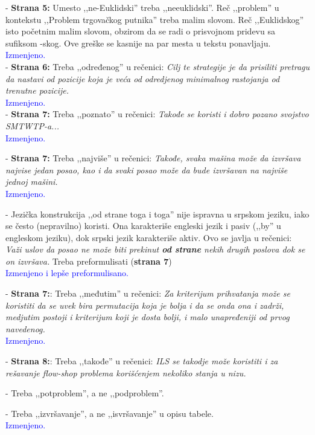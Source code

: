 \documentclass[a4paper]{report}
\newcommand{\odgovor}[1]{\textcolor{blue}{#1}}
\begin{document}
- \textbf{Strana 5:} Umesto ,,ne-Euklidski'' treba ,,neeuklidski''. Reč ,,problem'' u kontekstu ,,Problem trgovačkog putnika'' treba malim slovom. Reč ,,Euklidskog'' isto početnim malim slovom, obzirom da se radi o prisvojnom pridevu sa sufiksom -skog. Ove greške se kasnije na par mesta u tekstu ponavljaju.\\
\odgovor{Izmenjeno.\\}
- \textbf{Strana 6:} Treba ,,određenog'' u rečenici: {\em Cilj te strategije je da prisiliti pretragu da nastavi od pozicije koja je veća od odredjenog minimalnog rastojanja od trenutne pozicije.}\\
\odgovor{Izmenjeno.\\}
- \textbf{Strana 7:} Treba ,,poznato'' u rečenici: {\em Takođe se koristi i dobro pozano svojstvo SMTWTP-a...}\\
\odgovor{Izmenjeno.\\}

- \textbf{Strana 7:} Treba ,,najviše'' u rečenici: {\em Takođe, svaka mašina može da izvršava najvise jedan posao, kao i da svaki posao može da bude izvršavan na najviše jednoj mašini.}\\
\odgovor{Izmenjeno.\\}

- Jezička konstrukcija ,,od strane toga i toga'' nije ispravna u srpskom jeziku, iako se često (nepravilno) koristi. Ona karakteriše engleski jezik i pasiv (,,by'' u engleskom jeziku), dok srpski jezik karakteriše aktiv.
Ovo se javlja u rečenici: {\em Važi uslov da posao ne može biti prekinut \textbf{od strane} nekih drugih poslova dok se on izvršava.} Treba preformulisati (\textbf{strana 7})\\
\odgovor{Izmenjeno i lepše preformulisano.\\}

- \textbf{Strana 7:}: Treba ,,međutim'' u rečenici: {\em Za kriterijum prihvatanja može se koristiti da se uvek bira permutacija koja je bolja i da se onda ona i zadrži, medjutim postoji i kriterijum koji je dosta bolji, i malo unapređeniji od prvog navedenog.}\\
\odgovor{Izmenjeno.\\}

- \textbf{Strana 8:}: Treba ,,takođe'' u rečenici: {\em ILS se takodje može koristiti i za rešavanje flow-shop problema korišćenjem nekoliko stanja u nizu.}

- Treba ,,potproblem'', a ne ,,podproblem''.

- Treba ,,izvršavanje'', a ne ,,isvršavanje'' u opisu tabele.\\
\odgovor{Izmenjeno.\\}
\end{document}
